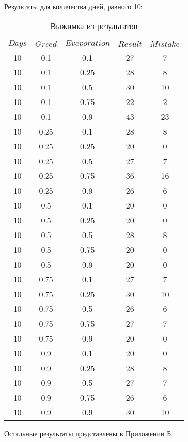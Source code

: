 \documentclass{bmstu}
\begin{document}
\newpage
Результаты для количества дней, равного 10:
\begin{center}
	\captionsetup{justification=raggedright,singlelinecheck=off}
	\begin{longtable}[c]{|c|c|c|c|c|}
		\caption{Выжимка из результатов\label{tbl:table_2}}\\ \hline
		$Days$ & $Greed$ & $Evaporation$ & $Result$ & $Mistake$ \\ \hline
		10 & 0.1 & 0.1 & 27 & 7 \\\hline
10 & 0.1 & 0.25 & 28 & 8 \\\hline
10 & 0.1 & 0.5 & 30 & 10 \\\hline
10 & 0.1 & 0.75 & 22 & 2 \\\hline
10 & 0.1 & 0.9 & 43 & 23 \\\hline
10 & 0.25 & 0.1 & 28 & 8 \\\hline
10 & 0.25 & 0.25 & 20 & 0 \\\hline
10 & 0.25 & 0.5 & 27 & 7 \\\hline
10 & 0.25 & 0.75 & 36 & 16 \\\hline
10 & 0.25 & 0.9 & 26 & 6 \\\hline
10 & 0.5 & 0.1 & 20 & 0 \\\hline
10 & 0.5 & 0.25 & 20 & 0 \\\hline
10 & 0.5 & 0.5 & 28 & 8 \\\hline
10 & 0.5 & 0.75 & 20 & 0 \\\hline
10 & 0.5 & 0.9 & 20 & 0 \\\hline
10 & 0.75 & 0.1 & 27 & 7 \\\hline
10 & 0.75 & 0.25 & 30 & 10 \\\hline
10 & 0.75 & 0.5 & 26 & 6 \\\hline
10 & 0.75 & 0.75 & 27 & 7 \\\hline
10 & 0.75 & 0.9 & 20 & 0 \\\hline
10 & 0.9 & 0.1 & 20 & 0 \\\hline
10 & 0.9 & 0.25 & 28 & 8 \\\hline
10 & 0.9 & 0.5 & 27 & 7 \\\hline
10 & 0.9 & 0.75 & 26 & 6 \\\hline
10 & 0.9 & 0.9 & 30 & 10 \\\hline
	\end{longtable}
\end{center}

Остальные результаты представлены в Приложении Б.
\end{document}
